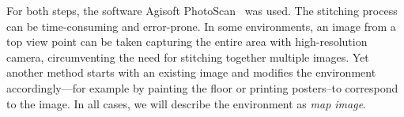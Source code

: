 For both steps, the software Agisoft
PhotoScan~\cite{agisoft2013agisoft} was used. The stitching process
can be time-consuming and error-prone. In some environments, an image
from a top view point can be taken capturing the entire area with
high-resolution camera, circumventing the need for stitching together
multiple images. Yet another method starts with an existing image and
modifies the environment accordingly---for example by painting the
floor or printing posters--to correspond to the image. In all cases,
we will describe the environment as \emph{map image}. 
